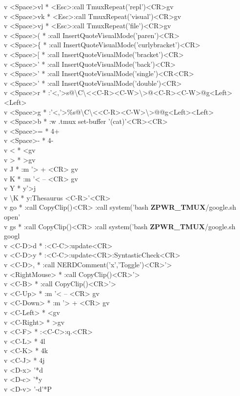 \documentclass[11pt,a4paper,twoside]{book}
\begin{document}
v  <Space>vl  * <Esc>:call TmuxRepeat('repl')<CR>gv\\
v  <Space>vk  * <Esc>:call TmuxRepeat('visual')<CR>gv\\
v  <Space>vj  * <Esc>:call TmuxRepeat('file')<CR>gv\\
v  <Space>(  * :call InsertQuoteVisualMode('paren')<CR>\\
v  <Space>\{  * :call InsertQuoteVisualMode('curlybracket')<CR>\\
v  <Space>[  * :call InsertQuoteVisualMode('bracket')<CR>\\
v  <Space>'  * :call InsertQuoteVisualMode('back')<CR>\\
v  <Space>'  * :call InsertQuoteVisualMode('single')<CR<CR>\\
v  <Space>'  * :call InsertQuoteVisualMode('double')<CR>\\
v  <Space>r  * :'<,'>s@\textbackslash{}C\textbackslash{}<<C-R><C-W>\textbackslash{}>@<C-R><C-W>@g<Left><Left>\\
v  <Space>g  * :'<,'>\%s@\textbackslash{}C\textbackslash{}<<C-R><C-W>\textbackslash{}>@@g<Left><Left>\\
v  <Space>b  * :w .tmux set-buffer '(cat)'<CR><CR>\\
v  <Space>=  * 4+\\
v  <Space>-  * 4-\\
v  <  * <gv\\
v  >  * >gv\\
v  J  * :m '> + <CR> gv\\
v  K  * :m '< -- <CR> gv\\
v  Y  * y'>j\\
v  \textbackslash{}K  * y:Thesaurus <C-R>'<CR>\\
v  go  * :call CopyClip()<CR> :call system('bash \textbf{ZPWR\_TMUX}/google.sh open'\\
v  gs  * :call CopyClip()<CR> :call system('bash \textbf{ZPWR\_TMUX}/google.sh googl\\
v  <C-D>d  * :<C-C>:update<CR>\\
v  <C-D>y  * :<C-C>:update<CR>:SyntasticCheck<CR>\\
v  <C-D>,  * :call NERDComment('x','Toggle')<CR>'>\\
v  <RightMouse> * :call CopyClip()<CR>'>\\
v  <C-B>  * :call CopyClip()<CR>'>\\
v  <C-Up>  * :m '< -- <CR> gv\\
v  <C-Down>  * :m '> + <CR> gv\\
v  <C-Left>  * <gv\\
v  <C-Right>  * >gv\\
v  <C-F>  * :<C-C>:q.<CR>\\
v  <C-L>  * 4l\\
v  <C-K>  * 4k\\
v  <C-J>  * 4j\\
v  <D-x>  '*d\\
v  <D-c>  '*y\\
v  <D-v>  '-d'*P\\
\end{document}
